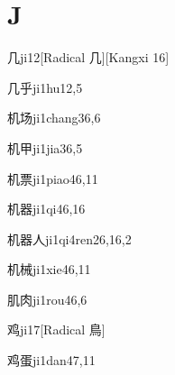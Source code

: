 
\section*{J}

\begin{verbete}{几}{ji1}{2}[Radical 几][Kangxi 16]
\end{verbete}

\begin{verbete}{几乎}{ji1hu1}{2,5}
\end{verbete}

\begin{verbete}{机场}{ji1chang3}{6,6}
\end{verbete}

\begin{verbete}{机甲}{ji1jia3}{6,5}
\end{verbete}

\begin{verbete}{机票}{ji1piao4}{6,11}
\end{verbete}

\begin{verbete}{机器}{ji1qi4}{6,16}
\end{verbete}

\begin{verbete}{机器人}{ji1qi4ren2}{6,16,2}
\end{verbete}

\begin{verbete}{机械}{ji1xie4}{6,11}
\end{verbete}

\begin{verbete}{肌肉}{ji1rou4}{6,6}
\end{verbete}

\begin{verbete}{鸡}{ji1}{7}[Radical 鳥]
\end{verbete}

\begin{verbete}{鸡蛋}{ji1dan4}{7,11}
\end{verbete}

